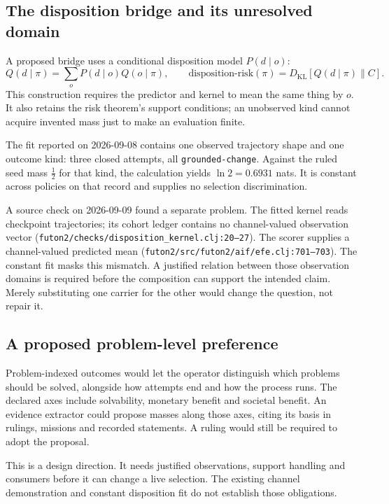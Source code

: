 \subsection{The disposition bridge and its unresolved domain}\label{sec:c-bridge}

A proposed bridge uses a conditional disposition model $P(d\mid o)$:
\[
Q(d\mid\pi)=\textstyle\sum_o P(d\mid o)Q(o\mid\pi),\qquad
\mathrm{disposition\mbox{-}risk}(\pi)=D_{\mathrm{KL}}[Q(d\mid\pi)\|C].
\]
This construction requires the predictor and kernel to mean the same thing by
$o$. It also retains the risk theorem's support conditions; an unobserved kind
cannot acquire invented mass just to make an evaluation finite.

The fit reported on 2026-09-08 contains one observed trajectory shape and one
outcome kind: three closed attempts, all \texttt{grounded-change}. Against the
ruled seed mass $\tfrac12$ for that kind, the calculation yields
$\ln 2=0.6931$ nats. It is constant across policies on that record and supplies
no selection discrimination.

A source check on 2026-09-09 found a separate problem. The fitted kernel reads
checkpoint trajectories; its cohort ledger contains no channel-valued
observation vector (\texttt{futon2/checks/disposition\_kernel.clj:20--27}).
The scorer supplies a channel-valued predicted mean
(\texttt{futon2/src/futon2/aif/efe.clj:701--703}). The constant fit masks this
mismatch. A justified relation between those observation domains is required
before the composition can support the intended claim. Merely substituting one
carrier for the other would change the question, not repair it.



\subsection{A proposed problem-level preference}\label{sec:c-problems}

Problem-indexed outcomes would let the operator distinguish which problems
should be solved, alongside how attempts end and how the process runs.
The declared axes include solvability, monetary benefit and societal benefit.
An evidence extractor could propose masses along those axes, citing its basis
in rulings, missions and recorded statements. A ruling would still be required
to adopt the proposal.

This is a design direction. It needs justified observations, support handling
and consumers before it can change a live selection. The existing channel
demonstration and constant disposition fit do not establish those obligations.
